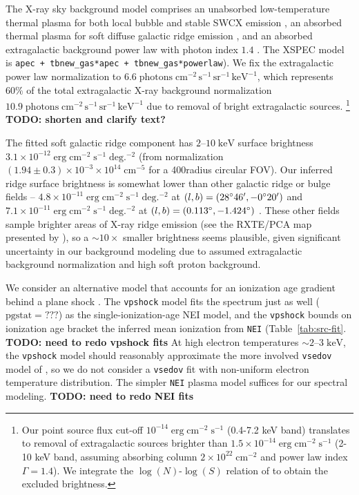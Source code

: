 \documentclass[preprint2,tighten,trackchanges]{aastex6}
\newcommand*{\mt}{\mathrm}
\newcommand*{\unit}[1]{\;\mt{#1}}  %
\newcommand*{\abt}{\mathord{\sim}} %
\newcommand*{\nHUnits}{\times 10^{22} \unit{cm^{-2}}}
\begin{document}
The X-ray sky background model comprises an unabsorbed low-temperature thermal
plasma for both local bubble and stable SWCX emission
\citep{mccammon1990, snowden1990, cravens2000, galeazzi2014, smith2014},
an absorbed thermal plasma for soft diffuse galactic ridge emission
\citep[e.g.][]{kaneda1997}, and an absorbed extragalactic
background power law with photon index $1.4$ \citep{hickox2006}.
The XSPEC model is \texttt{apec + tbnew\_gas*apec + tbnew\_gas*powerlaw}).
We fix the extragalactic power law normalization to
$6.6 \unit{photons\; cm^{-2}\, s^{-1}\, sr^{-1}\, keV^{-1}}$, which
represents $60\%$ of the total extragalactic X-ray background normalization
$10.9 \unit{photons\; cm^{-2}\, s^{-1}\, sr^{-1}\, keV^{-1}}$
\citep{hickox2006} due to removal of bright extragalactic sources.
\footnote{Our point source flux cut-off $10^{-14} \unit{erg\;cm^{-2}\;s^{-1}}$
(0.4-7.2 keV band) translates to removal of extragalactic sources brighter than
$1.5 \times 10^{-14} \unit{erg\;cm^{-2}\;s^{-1}}$ (2-10 keV band, assuming
absorbing column $2 \nHUnits$ and power law index $\Gamma = 1.4$).
We integrate the $\log(N)$-$\log(S)$ relation of \citet{moretti2003} to obtain
the excluded brightness.}
\textbf{TODO: shorten and clarify text?}  %

The fitted soft galactic ridge component has $2$--$10 \unit{keV}$ surface
brightness $3.1 \times 10^{-12} \unit{erg\;cm^{-2}\;s^{-1}\;deg.^{-2}}$ (from
normalization $(1.94 \pm 0.3) \times 10^{-3} \times 10^{14} \unit{cm^{-5}}$ for
a 400\arcsec radius circular FOV).
Our inferred ridge surface brightness is somewhat lower than
other galactic ridge or bulge fields --
$4.8 \times 10^{-11} \unit{erg\;cm^{-2}\;s^{-1}\;deg.^{-2}}$
at $(l,b) = (28\mbox{$^\circ$} 46\mbox{$^\prime$}, -0\mbox{$^\circ$} 20\mbox{$^\prime$})$ \citep{ebisawa2008}
and
$7.1 \times 10^{-11} \unit{erg\;cm^{-2}\;s^{-1}\;deg.^{-2}}$
at $(l,b) = (0.113\mbox{$^\circ$}, -1.424\mbox{$^\circ$})$ \citep{revnivtsev2009}.
These other fields sample brighter areas of X-ray ridge emission (see the
RXTE/PCA map presented by \citet{revnivtsev2006}), so a $\abt 10\times$ smaller
brightness seems plausible, given significant uncertainty in our background
modeling due to assumed extragalactic background normalization and high soft
proton background.

We consider an alternative model that accounts for an ionization age gradient
behind a plane shock \citep{borkowski2001}.
The \texttt{vpshock} model fits the spectrum just as well
($\mathrm{pgstat} = ???$) as the single-ionization-age NEI model, and the
\texttt{vpshock} bounds on ionization age bracket the inferred mean ionization
from \texttt{NEI} (Table~\ref{tab:src-fit}.
\textbf{TODO: need to redo vpshock fits}
At high electron temperatures $\abt 2$--$3 \unit{keV}$, the
\texttt{vpshock} model should reasonably approximate the more involved
\texttt{vsedov} model of \citet{borkowski2001}, so we do not consider a
\texttt{vsedov} fit with non-uniform electron temperature distribution.
The simpler \texttt{NEI} plasma model suffices for our spectral modeling.
\textbf{TODO: need to redo NEI fits}
\end{document}
